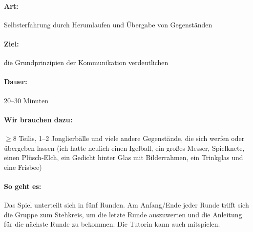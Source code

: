 \paragraph{Art:} Selbsterfahrung durch Herumlaufen und Übergabe von Gegenständen
\paragraph{Ziel:} die Grundprinzipien der Kommunikation verdeutlichen
\paragraph{Dauer:} 20--30 Minuten
\paragraph{Wir brauchen dazu:} $\geq 8$ Teilis, 1--2 Jonglierbälle und viele andere Gegenstände, die sich werfen oder übergeben lassen (ich hatte neulich einen Igelball, ein großes Messer, Spielknete, einen Plüsch-Elch, ein Gedicht hinter Glas mit Bilderrahmen, ein Trinkglas und eine Frisbee)
\paragraph{So geht es:} Das Spiel unterteilt sich in fünf Runden. Am Anfang/Ende jeder Runde trifft sich die Gruppe zum Stehkreis, um die letzte Runde auszuwerten und die Anleitung für die nächste Runde zu bekommen. Die Tutorin kann auch mitspielen.

